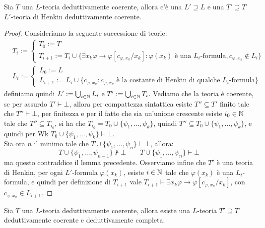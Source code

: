\begin{lemma}
    Sia $T$ una $L$-teoria deduttivamente coerente, allora c'è una  $L' \supseteq L$ e una  $T' \supseteq T$ $L'$-teoria di Henkin deduttivamente coerente.
\end{lemma}

\begin{proof}
    Consideriamo la seguente successione di teorie:
    \begin{align*} &T_i := \begin{cases}
        T_0 := T \\
        T_{i+1} := T_i \cup \{\exists x_k \varphi \to \varphi[c_{\varphi,x_k}/x_k] : \varphi(x_k) \text{ è una $L_i$-formula}, c_{\varphi,x_k} \not \in L_i\}
    \end{cases} \\
    &L_i :=  \begin{cases}
        L_0 := L \\
        L_{i+1} := L_i \cup \{c_{\varphi,x_k} : \text{$c_{\varphi,x_k}$ è la costante di Henkin di qualche $L_i$-formula}\}
    \end{cases}
    \end{align*}
    definiamo quindi $L' := \bigcup_{i \in \mathbb N} L_i$ e $T' := \bigcup_{i \in \mathbb N} T_i$. Vediamo che la teoria è coerente,
    se per assurdo $T' \vdash \bot$, allora per compattezza sintattica esiste $T'' \subseteq T'$ finito tale che $T'' \vdash \bot$, per finitezza e per il fatto che sia un'unione crescente esiste $i_0 \in \mathbb N$
    tale che $T'' \subseteq T_{i_0}$, si ha che $T_{i_0} = T_0 \cup \{\psi_1,\ldots,\psi_k\}$, quindi $T'' \subseteq T_0 \cup \{\psi_1,\ldots,\psi_k\}$, e quindi per Wk $T_0 \cup \{\psi_1,\ldots,\psi_k\} \vdash \bot$.\\
    Sia ora $n$ il minimo tale che $T \cup \{\psi_1,\ldots,\psi_n\} \vdash\bot$, allora:
    \[ T \cup \{\psi_1,\ldots,\psi_{n-1}\} \nvdash \bot \qquad T \cup \{\psi_1,\ldots,\psi_n\} \vdash \bot \]
    ma questo contraddice il lemma precedente. Osserviamo infine che $T'$ è una teoria di Henkin, per ogni $L'$-formula $\varphi(x_k)$, esiste $i \in \mathbb N$ tale che $\varphi(x_k)$ è una $L_i$-formula,
    e quindi per definizione di $T_{i+1}$ vale $T_{i+1} \vdash \exists x_k \varphi \to \varphi[c_{\varphi,x_k}/x_k]$, con $c_{\varphi,x_k} \in L_{i+1}$.
\end{proof}

\begin{lemma}[di Lindenbaum]
    Sia $T$ una $L$-teoria deduttivamente coerente, allora esiste una $L$-teoria $T' \supseteq T$ deduttivamente coerente e deduttivamente completa.
\end{lemma}

